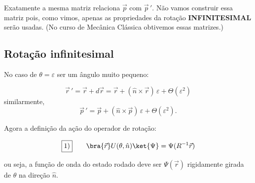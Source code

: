 Exatamente a mesma matriz relaciona $\vec{p}$ com $\vec{p}\,'$. Não vamos construir essa matriz pois, como vimos, apenas as propriedades da rotação \textbf{INFINITESIMAL} serão usadas. (No curso de Mecânica Clássica obtivemos essas matrizes.)

\subsection*{Rotação infinitesimal}

No caso de $\theta = \varepsilon$ ser um ângulo muito pequeno:

\begin{center}
\end{center}

\begin{equation}
    \vec{r}\,' = \vec{r} + d\vec{r} = \vec{r} + (\hat{n}\times\vec{r})\,\varepsilon + \Theta(\varepsilon^2)
\label{eq:aula21_r_linha}
\end{equation}
similarmente,
\begin{equation}
    \vec{p}\,' = \vec{p} + (\hat{n}\times\vec{p})\,\varepsilon + \Theta(\varepsilon^2).
\label{eq:aula21_p_linha}
\end{equation}

Agora a definição da ação do operador de rotação:

\begin{equation}
    \fbox{1)} \qquad \bra{\vec{r}} U(\theta,\hat{n}) \ket{\Psi} = \Psi(R^{-1}\vec{r})
\label{eq:aula21_U_def}
\end{equation}

ou seja, a função de onda do estado rodado deve ser $\Psi(\vec{r})$ rigidamente girada de $\theta$ na direção $\hat{n}$.


